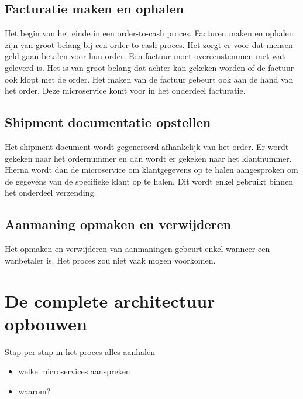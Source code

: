 \subsection{Facturatie maken en ophalen}
Het begin van het einde in een order-to-cash proces. Facturen maken en ophalen zijn van groot belang bij een order-to-cash proces. Het zorgt er voor dat mensen geld gaan betalen voor hun order. Een factuur moet overeenstemmen met wat geleverd is. Het is van groot belang dat achter kan gekeken worden of de factuur ook klopt met de order. Het maken van de factuur gebeurt ook aan de hand van het order. 
Deze microservice komt voor in het onderdeel facturatie.

\subsection{Shipment documentatie opstellen}
Het shipment document wordt gegenereerd afhankelijk van het order. Er wordt gekeken naar het ordernummer en dan wordt er gekeken naar het klantnummer. Hierna wordt dan de microservice om klantgegevens op te halen aangesproken om de gegevens van de specifieke klant op te halen. Dit wordt enkel gebruikt binnen het onderdeel verzending.

\subsection{Aanmaning opmaken en verwijderen}
Het opmaken en verwijderen van aanmaningen gebeurt enkel wanneer een wanbetaler is. Het proces zou niet vaak mogen voorkomen. 



\section{De complete architectuur opbouwen}
Stap per stap in het proces alles aanhalen
\begin{itemize}
	\item welke microservices aanspreken
	\item waarom?
\end{itemize}



